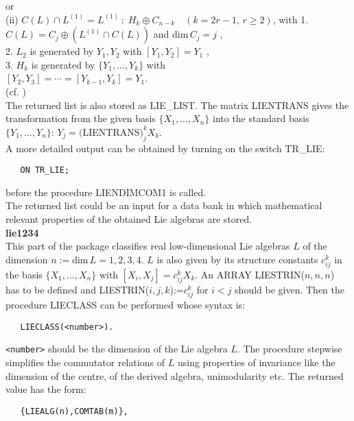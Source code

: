 or\\[0.05cm]
\hspace*{0.3cm} (ii) $C(L)\cap L^{(1)}=L^{(1)}\, :\; H_k\oplus C_{n-k}\quad
(k=2r-1,\, r\geq 2)$, with\newpage
\hspace*{0.3cm} 1. $C(L)=C_j\oplus (L^{(1)}\cap C(L))$
and dim$\,C_j=j$ ,\\[0.05cm]
\hspace*{0.3cm} 2. $L_2$ is generated by
$Y_1,Y_2$ with $[Y_1,Y_2]=Y_1$ ,\\[0.05cm]
\hspace*{0.3cm} 3. $H_k$ is generated by $\{Y_1,\ldots,Y_k\}$ with\\
\hspace*{0.7cm} $[Y_2,Y_3]=\cdots =[Y_{k-1},Y_k]=Y_1$.\\[0.2cm]
(cf. \cite{cssmp92})\\[0.2cm]
The returned list is also stored as LIE\_LIST. The matrix LIENTRANS gives the
transformation from the given basis $\{X_1,\ldots ,X_n\}$ into the standard
basis $\{Y_1,\ldots ,Y_n\}$: $Y_j=($LIENTRANS$)_j^k X_k$.\\[0.1cm]
A more detailed output can be obtained by turning on the switch TR\_LIE:
\begin{verbatim}
   ON TR_LIE;
\end{verbatim}
before the procedure LIENDIMCOM1 is called.\\[0.1cm]
The returned list could be an input for a data bank in which mathematical
relevant properties of the obtained Lie algebras are stored.\\[0.3cm]
{\large\bf lie1234}\\[0.1cm]
This part of the package classifies real low-dimensional Lie algebras $L$
of the dimension
$n:=$dim$\,L=1,2,3,4$. $L$ is also given by its structure constants $c_{ij}^k$
in the basis $\{X_1,\ldots,X_n\}$ with $[X_i,X_j]=c_{ij}^k X_k$. An ARRAY
LIESTRIN($n,n,n$) has to be defined and LIESTRIN($i,j,k$):=$c_{ij}^k$ for
$i<j$ should be given. Then the procedure LIECLASS can be performed
whose syntax is:
\begin{verbatim}
   LIECLASS(<number>).
\end{verbatim}
{\tt <number>} should be the dimension of the Lie algebra $L$. The procedure
stepwise simplifies the commutator relations of $L$ using properties of
invariance like the dimension of the centre, of the derived algebra,
unimodularity etc.  The returned value has the form:
\begin{verbatim}
   {LIEALG(n),COMTAB(m)},
\end{verbatim}
